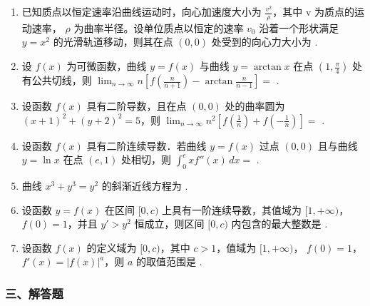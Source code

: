 \documentclass[12pt, a4paper]{ctexart}
\begin{document}
\begin{enumerate}[start=21]
    \item 已知质点以恒定速率沿曲线运动时，向心加速度大小为 $ \frac{v^{2}}{\rho} $，其中 v 为质点的运动速率， $ \rho $ 为曲率半径。设单位质点以恒定的速率 $ v_{0} $ 沿着一个形状满足 $ y = x^{2} $ 的光滑轨道移动，则其在点 $ (0,0) $ 处受到的向心力大小为 \underline{\hspace{2cm}}.

    \item 设 $ f(x) $ 为可微函数，曲线 $ y = f(x) $ 与曲线 $ y = \arctan x $ 在点 $ \left(1, \frac{\pi}{4}\right) $ 处有公共切线，则 $ \lim_{n \to \infty} n \left[ f\left( \frac{n}{n+1} \right) - \arctan \frac{n}{n-1} \right] = $ \underline{\hspace{2cm}}.

    \item 设函数 $ f(x) $ 具有二阶导数，且在点 $ (0,0) $ 处的曲率圆为 $ (x+1)^{2}+(y+2)^{2}=5 $，则 $ \lim_{n\to\infty}n^{2}\left[f\left(\frac{1}{n}\right)+f\left(-\frac{1}{n}\right)\right]= $ \underline{\hspace{2cm}}.

    \item 设函数 $ f(x) $ 具有二阶连续导数．若曲线 $ y = f(x) $ 过点 $ (0,0) $ 且与曲线 $ y = \ln x $ 在点 $ (e,1) $ 处相切，则 $ \int_{0}^{e} x f''(x) \, dx = $ \underline{\hspace{2cm}}.

    \item 曲线 $ x^{3}+y^{3}=y^{2} $ 的斜渐近线方程为 \underline{\hspace{2cm}}.

    \item 设函数 $ y = f(x) $ 在区间 $ [0, c) $ 上具有一阶连续导数，其值域为 $ [1, +\infty) $， $ f(0) = 1 $，并且 $ y' > y^2 $ 恒成立，则区间 $ [0, c) $ 内包含的最大整数是 \underline{\hspace{2cm}}.

    \item 设函数 $ f(x) $ 的定义域为 $ [0,c) $，其中 $ c>1 $，值域为 $ [1,+\infty) $， $ f(0)=1 $， $ f'(x)=\left|f(x)\right|^a $，则 $ a $ 的取值范围是 \underline{\hspace{2cm}}.
\end{enumerate}

\subsubsection*{三、解答题}
\end{document}
